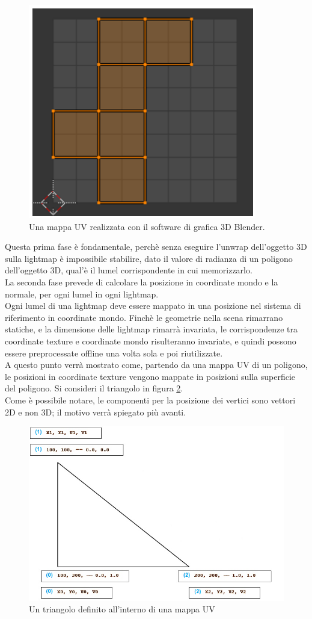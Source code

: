 \newpage
\begin{figure}[htb]
 \centering
 \includegraphics[width=0.5\linewidth]{images/chapter_stato_arte/stato_arte_uvmap_blender.png}\hfill
 \caption[Mappa UV realizzata in Blender]{Una mappa UV realizzata con il software di grafica 3D Blender.}
 \label{fig:stato_arte_uvmap_blender}
\end{figure}
Questa prima fase è fondamentale, perchè senza eseguire l’unwrap dell’oggetto 3D sulla lightmap è impossibile stabilire, dato il valore di radianza di un poligono dell’oggetto 3D, qual’è il lumel corrispondente in cui memorizzarlo.
\\
La seconda fase prevede di calcolare la posizione in coordinate mondo e la normale, per ogni lumel in ogni lightmap. \cite{light10,light9}
\\
Ogni lumel di una lightmap deve essere mappato in una posizione nel sistema di riferimento in coordinate mondo. Finchè le geometrie nella scena rimarrano statiche, e la dimensione delle lightmap rimarrà invariata, le corrispondenze tra coordinate texture e coordinate mondo risulteranno invariate, e quindi possono essere preprocessate offline una volta sola e poi riutilizzate.
\\
A questo punto verrà mostrato come, partendo da una mappa UV di un poligono, le posizioni in coordinate texture vengono mappate in posizioni sulla superficie del poligono.
Si consideri il triangolo in figura \ref{fig:stato_arte_ligh_triangle1}.
\\
Come è possibile notare, le componenti per la posizione dei vertici sono vettori 2D e non 3D; il motivo verrà spiegato più avanti.
\newpage
\begin{figure}[htb]
 \centering
 \includegraphics[width=0.7\linewidth]{images/chapter_stato_arte/stato_arte_ligh_triangle1.png}\hfill
 \caption[Triangolo di esempio per mapping UV]{Un triangolo definito all'interno di una mappa UV}
 \label{fig:stato_arte_ligh_triangle1}
\end{figure}
